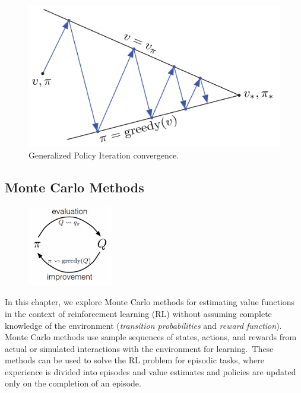 \documentclass[../xlapes02]{subfiles}
\begin{document}
    \begin{figure}[h!]
        \centering
        \begin{minipage}[b]{0.5\textwidth}
            \includegraphics[width=\textwidth]{image/gpi2}
            \caption{Generalized Policy Iteration convergence.}
            \label{fig:gpi}
        \end{minipage}
    \end{figure}

    \subsection{Monte Carlo Methods}\label{subsec:monte-carlo-methods}
    \begin{figure}
        \begin{center}
            \includegraphics[width=0.33\textwidth]{image/mc-evaluation-improvement}
        \end{center}
    \end{figure}

    In this chapter, we explore Monte Carlo methods for estimating value functions in the context of reinforcement learning (RL) without assuming complete knowledge of the environment (\emph{transition probabilities} and \emph{reward function}). Monte Carlo methods use sample sequences of states, actions, and rewards from actual or simulated interactions with the environment for learning.\ These methods can be used to solve the RL problem for episodic tasks, where experience is divided into episodes and value estimates and policies are updated only on the completion of an episode.
\end{document}
